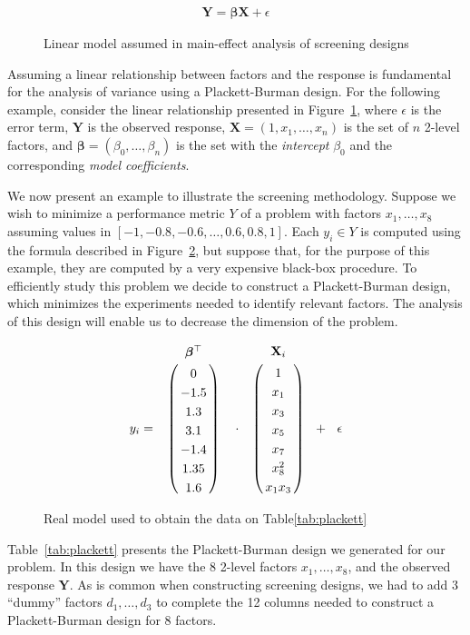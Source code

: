 \documentclass[conference]{IEEEtran}
\begin{document}
\begin{figure}[htpb]
{\normalsize
\begin{align*}
\mathbf{Y} = \bm{\beta}\mathbf{X} + \epsilon
\end{align*}
}
\caption{Linear model assumed in main-effect analysis of screening designs}
\label{fig:linear_assumption}
\end{figure}

Assuming a linear relationship between factors and the response is fundamental
for the analysis of variance using a Plackett-Burman design. For the following
example, consider the linear relationship presented in
Figure~\ref{fig:linear_assumption}, where \(\epsilon\) is the error term,
\(\mathbf{Y}\) is the observed response, \(\mathbf{X} = \left(1,
x_1,\dots,x_n\right)\) is the set of \(n\) 2-level factors, and \(\bm{\beta} =
\left(\beta_0,\dots,\beta_n\right)\) is the set with the \emph{intercept} \(\beta_0\)
and the corresponding \emph{model coefficients}.

We now present an example to illustrate the screening methodology. Suppose we
wish to minimize a performance metric \(Y\) of a problem with factors
\(x_1,\dots,x_8\) assuming values in \([-1, -0.8, -0.6, \dots, 0.6, 0.8, 1]\). Each
\(y_i \in Y\) is computed using the formula described in
Figure~\ref{fig:real_model}, but suppose that, for the purpose of this
example, they are computed by a very expensive black-box procedure. To
efficiently study this problem we decide to construct a Plackett-Burman design,
which minimizes the experiments needed to identify relevant factors. The
analysis of this design will enable us to decrease the dimension of the problem.

\begin{figure}[htpb]
{\normalsize
\begin{align*}
y_i =
\bordermatrix{~ & \bm{\beta}^{\top} \cr & 0 \cr & -1.5 \cr & 1.3 \cr & 3.1 \cr & -1.4 \cr & 1.35 \cr & 1.6} \ \ \ \cdot
\bordermatrix{~ & \mathbf{X}_i \cr & 1 \cr & x_1 \cr & x_3 \cr & x_5
\cr & x_7 \cr & x_8^{2} \cr & x_1x_3} \ \ +
\ \ \epsilon
\end{align*}
}
\caption{Real model used to obtain the data on Table\ref{tab:plackett}}
\label{fig:real_model}
\end{figure}

Table~\ref{tab:plackett} presents the Plackett-Burman design we generated for
our problem. In this design we have the 8 2-level factors \(x_1,\dots,x_8\), and
the observed response \(\mathbf{Y}\). As is common when constructing screening
designs, we had to add 3 ``dummy'' factors \(d_1,\dots,d_3\) to complete the 12
columns needed to construct a Plackett-Burman design for 8 factors.
\end{document}
